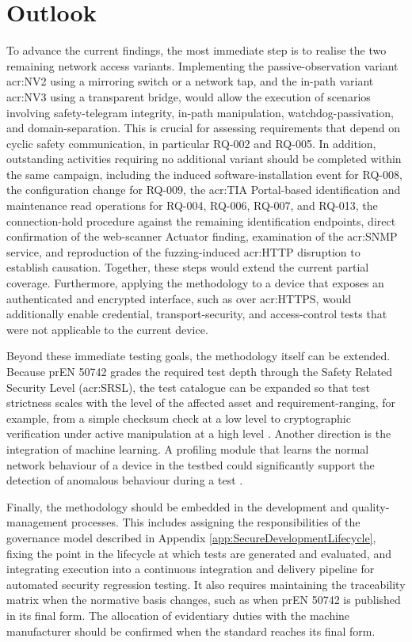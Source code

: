 \section{Outlook} 
\label{sec:future_work}

To advance the current findings, the most immediate step is to realise the two remaining network access variants. Implementing the passive-observation variant \gls{acr:NV2} using a mirroring switch or a network tap, and the in-path variant \gls{acr:NV3} using a transparent bridge, would allow the execution of scenarios involving safety-telegram integrity, in-path manipulation, watchdog-passivation, and domain-separation. This is crucial for assessing requirements that depend on cyclic safety communication, in particular RQ-002 and RQ-005. In addition, outstanding activities requiring no additional variant should be completed within the same campaign, including the induced software-installation event for RQ-008, the configuration change for RQ-009, the \gls{acr:TIA} Portal-based identification and maintenance read operations for RQ-004, RQ-006, RQ-007, and RQ-013, the connection-hold procedure against the remaining identification endpoints, direct confirmation of the web-scanner Actuator finding, examination of the \gls{acr:SNMP} service, and reproduction of the fuzzing-induced \gls{acr:HTTP} disruption to establish causation. Together, these steps would extend the current partial coverage. Furthermore, applying the methodology to a device that exposes an authenticated and encrypted interface, such as over \gls{acr:HTTPS}, would additionally enable credential, transport-security, and access-control tests that were not applicable to the current device.

Beyond these immediate testing goals, the methodology itself can be extended. Because prEN 50742 grades the required test depth through the Safety Related Security Level (\gls{acr:SRSL}), the test catalogue can be expanded so that test strictness scales with the level of the affected asset and requirement-ranging, for example, from a simple checksum check at a low level to cryptographic verification under active manipulation at a high level \cite[p. 21]{prEN50742_2025}. Another direction is the integration of machine learning. A profiling module that learns the normal network behaviour of a device in the testbed could significantly support the detection of anomalous behaviour during a test \cite[pp. 12]{siboni2016securitytestbedinternetthings}.

Finally, the methodology should be embedded in the development and quality-management processes. This includes assigning the responsibilities of the governance model described in Appendix \ref{app:SecureDevelopmentLifecycle}, fixing the point in the lifecycle at which tests are generated and evaluated, and integrating execution into a continuous integration and delivery pipeline for automated security regression testing. It also requires maintaining the traceability matrix when the normative basis changes, such as when prEN 50742 is published in its final form. The allocation of evidentiary duties with the machine manufacturer should be confirmed when the standard reaches its final form.

